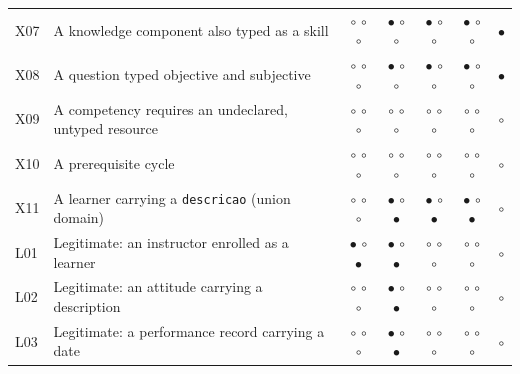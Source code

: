 \begin{table}[!t]
\begin{tabular}{llccccc}
X07 & A knowledge component also typed as a skill & $\circ$ $\circ$ $\circ$ & $\bullet$ $\circ$ $\circ$ & $\bullet$ $\circ$ $\circ$ & $\bullet$ $\circ$ $\circ$ & $\bullet$ \\
X08 & A question typed objective and subjective & $\circ$ $\circ$ $\circ$ & $\bullet$ $\circ$ $\circ$ & $\bullet$ $\circ$ $\circ$ & $\bullet$ $\circ$ $\circ$ & $\bullet$ \\
X09 & A competency requires an undeclared, untyped resource & $\circ$ $\circ$ $\circ$ & $\circ$ $\circ$ $\circ$ & $\circ$ $\circ$ $\circ$ & $\circ$ $\circ$ $\circ$ & $\circ$ \\
X10 & A prerequisite cycle & $\circ$ $\circ$ $\circ$ & $\circ$ $\circ$ $\circ$ & $\circ$ $\circ$ $\circ$ & $\circ$ $\circ$ $\circ$ & $\circ$ \\
X11 & A learner carrying a \texttt{descricao} (union domain) & $\circ$ $\circ$ $\circ$ & $\bullet$ $\circ$ $\bullet$ & $\bullet$ $\circ$ $\bullet$ & $\bullet$ $\circ$ $\bullet$ & $\circ$ \\
\hline
L01 & Legitimate: an instructor enrolled as a learner & $\bullet$ $\circ$ $\bullet$ & $\bullet$ $\circ$ $\bullet$ & $\circ$ $\circ$ $\circ$ & $\circ$ $\circ$ $\circ$ & $\circ$ \\
L02 & Legitimate: an attitude carrying a description & $\circ$ $\circ$ $\circ$ & $\bullet$ $\circ$ $\bullet$ & $\circ$ $\circ$ $\circ$ & $\circ$ $\circ$ $\circ$ & $\circ$ \\
L03 & Legitimate: a performance record carrying a date & $\circ$ $\circ$ $\circ$ & $\bullet$ $\circ$ $\bullet$ & $\circ$ $\circ$ $\circ$ & $\circ$ $\circ$ $\circ$ & $\circ$ \\
\hline
\end{tabular}
\end{table}
